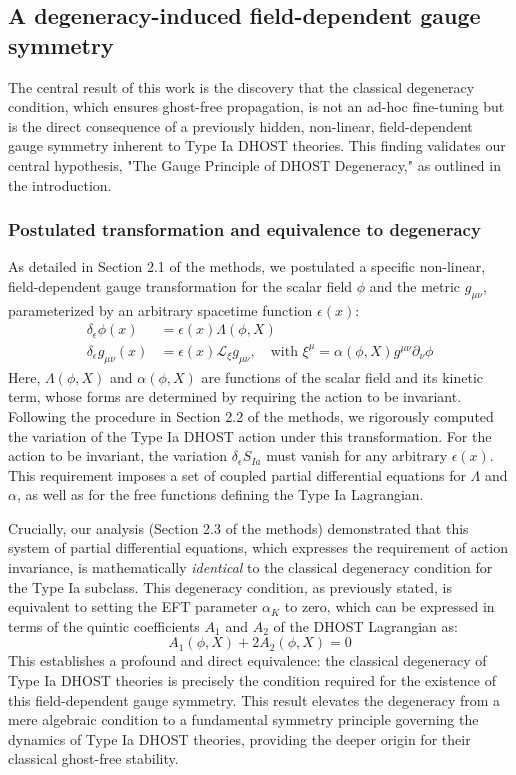 \documentclass[twocolumn]{aastex631}
\begin{document}
\subsection{A degeneracy-induced field-dependent gauge symmetry}
The central result of this work is the discovery that the classical degeneracy condition, which ensures ghost-free propagation, is not an ad-hoc fine-tuning but is the direct consequence of a previously hidden, non-linear, field-dependent gauge symmetry inherent to Type Ia DHOST theories. This finding validates our central hypothesis, "The Gauge Principle of DHOST Degeneracy," as outlined in the introduction.

\subsubsection{Postulated transformation and equivalence to degeneracy}
As detailed in Section 2.1 of the methods, we postulated a specific non-linear, field-dependent gauge transformation for the scalar field $\phi$ and the metric $g_{\mu\nu}$, parameterized by an arbitrary spacetime function $\epsilon(x)$:
\begin{align} \label{eq:phi_transform}
    \delta_\epsilon \phi(x) &= \epsilon(x) \Lambda(\phi, X) \\
    \delta_\epsilon g_{\mu\nu}(x) &= \epsilon(x) \mathcal{L}_{\xi} g_{\mu\nu}, \quad \text{with } \xi^\mu = \alpha(\phi, X) g^{\mu\nu}\partial_\nu\phi \label{eq:metric_transform}
\end{align}
Here, $\Lambda(\phi, X)$ and $\alpha(\phi, X)$ are functions of the scalar field and its kinetic term, whose forms are determined by requiring the action to be invariant. Following the procedure in Section 2.2 of the methods, we rigorously computed the variation of the Type Ia DHOST action under this transformation. For the action to be invariant, the variation $\delta_\epsilon S_{Ia}$ must vanish for any arbitrary $\epsilon(x)$. This requirement imposes a set of coupled partial differential equations for $\Lambda$ and $\alpha$, as well as for the free functions defining the Type Ia Lagrangian.

Crucially, our analysis (Section 2.3 of the methods) demonstrated that this system of partial differential equations, which expresses the requirement of action invariance, is mathematically \textit{identical} to the classical degeneracy condition for the Type Ia subclass. This degeneracy condition, as previously stated, is equivalent to setting the EFT parameter $\alpha_K$ to zero, which can be expressed in terms of the quintic coefficients $A_1$ and $A_2$ of the DHOST Lagrangian as:
\begin{equation} \label{eq:degeneracy_A1A2}
    A_1(\phi, X) + 2A_2(\phi, X) = 0
\end{equation}
This establishes a profound and direct equivalence: the classical degeneracy of Type Ia DHOST theories is precisely the condition required for the existence of this field-dependent gauge symmetry. This result elevates the degeneracy from a mere algebraic condition to a fundamental symmetry principle governing the dynamics of Type Ia DHOST theories, providing the deeper origin for their classical ghost-free stability.
\end{document}
